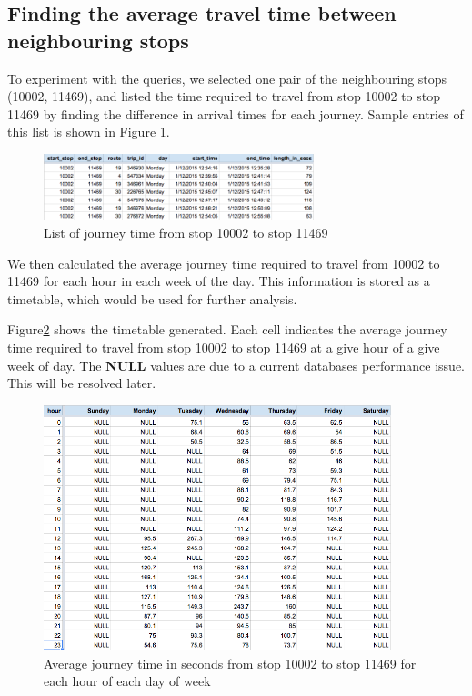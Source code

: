 \subsection{Finding the average travel time between neighbouring stops}
\par To experiment with the queries, we selected one pair of the neighbouring stops (10002, 11469), and listed the time required to travel from stop 10002 to stop 11469 by finding the difference in arrival times for each journey. Sample entries of this list is shown in Figure \ref{fig:journey_time_10002}.

\begin{figure}
\centering
\includegraphics[width=0.7\textwidth]{figures/journey_time_10002.png}
\caption{\label{fig:journey_time_10002} List of journey time from stop 10002 to stop 11469}
\end{figure}

\par We then calculated the average journey time required to travel from 10002 to 11469 for each hour in each week of the day. This information is stored as a timetable, which would be used for further analysis.

\par Figure\ref{fig:timetable_10002} shows the timetable generated. Each cell indicates the average journey time required to travel from stop 10002 to stop 11469 at a give hour of a give week of day. The \textbf{NULL} values are due to a current databases performance issue. This will be resolved later.

\begin{figure}
\centering
\includegraphics[width=0.9\textwidth]{figures/timetable_10002.png}
\caption{\label{fig:timetable_10002} Average journey time in seconds from stop 10002 to stop 11469 for each hour of each day of week}
\end{figure}

